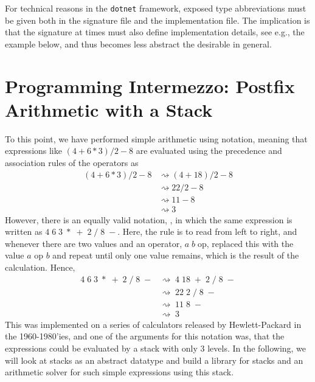 \documentclass[fsharpNotes.tex]{subfiles}
\begin{document}
For technical reasons in the  \lstinline[language=console]{dotnet} framework, exposed type abbreviations must be given both in the signature file and the implementation file. The implication is that the signature at times must also define implementation details, see e.g., the example below, and thus becomes less abstract the desirable in general.

\section{Programming Intermezzo: Postfix Arithmetic with a Stack}
\label{sec:stack}
To this point, we have performed simple arithmetic using  notation, meaning that expressions like $(4+6*3)/2-8$ are evaluated using the precedence and association rules of the operators as
\begin{align}
  (4+6*3)/2-8
  &\rightsquigarrow (4+18)/2-8\\
  &\rightsquigarrow 22/2-8\\
  &\rightsquigarrow 11-8\\
  &\rightsquigarrow 3
\end{align}
However, there is an equally valid notation, , in which the same expression is written as $4\; 6\; 3\; *\; +\; 2\; /\; 8\; -$. Here, the rule is to read from left to right, and whenever there are two values and an operator, $a\; b\; \text{op}$, replaced this with the value $a \text{ op } b$ and repeat until only one value remains, which is the result of the calculation. Hence,
\begin{align}
  4\; 6\; 3\; *\; +\; 2\; /\; 8\; -
  &\rightsquigarrow\; 4\; 18\; +\; 2\; /\; 8\; -\\
  &\rightsquigarrow\; 22\; 2\; /\; 8\; -\\
  &\rightsquigarrow\; 11\; 8\; -\\
  &\rightsquigarrow\; 3
\end{align}
This was implemented on a series of calculators released by Hewlett-Packard in the 1960-1980'ies, and one of the arguments for this notation was, that the expressions could be evaluated by a stack with only 3 levels. In the following, we will look at stacks as an abstract datatype and build a library for stacks and an arithmetic solver for such simple expressions using this stack.
\end{document}
